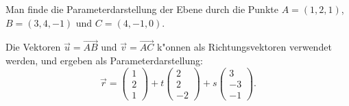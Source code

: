 \begin{beispiel}
Man finde die Parameterdarstellung der Ebene durch die Punkte
$A=(1,2,1)$,
$B=(3,4,-1)$ und
$C=(4,-1,0)$.

\smallskip

{\parindent 0pt Die} Vektoren $\vec u=\overrightarrow{AB}$ und
$\vec v=\overrightarrow{AC}$ k"onnen als Richtungsvektoren
verwendet werden, und ergeben als Parameterdarstellung:
\begin{equation}
\vec r=\begin{pmatrix}1\\2\\1 \end{pmatrix}
+
t\begin{pmatrix}2\\2\\-2\end{pmatrix}
+
s\begin{pmatrix}3\\-3\\-1\end{pmatrix}.
\label{beispielebene}
\end{equation}
\end{beispiel}

